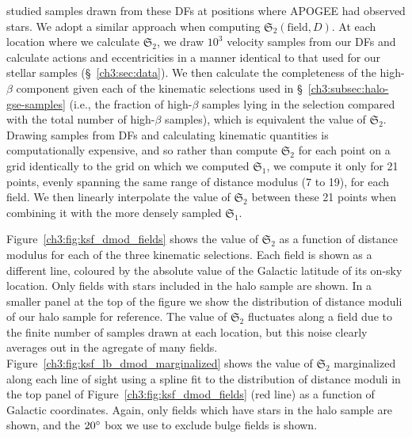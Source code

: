\cite{lane22} studied samples drawn from these DFs at positions where APOGEE had observed stars. We adopt a similar approach when computing $\mathfrak{S}_{2}(\mathrm{field},D)$. At each location where we calculate $\mathfrak{S}_{2}$, we draw $10^{3}$ velocity samples from our DFs and calculate actions and eccentricities in a manner identical to that used for our stellar samples (\S~\ref{ch3:sec:data}). We then calculate the completeness of the high-$\beta$ component given each of the kinematic selections used in \S~\ref{ch3:subsec:halo-gse-samples} (i.e., the fraction of high-$\beta$ samples lying in the selection compared with the total number of high-$\beta$ samples), which is equivalent the value of $\mathfrak{S}_{2}$. Drawing samples from DFs and calculating kinematic quantities is computationally expensive, and so rather than compute $\mathfrak{S}_{2}$ for each point on a grid identically to the grid on which we computed $\mathfrak{S}_{1}$, we compute it only for 21 points, evenly spanning the same range of distance modulus (7 to 19), for each field. We then linearly interpolate the value of $\mathfrak{S}_{2}$ between these 21 points when combining it with the more densely sampled $\mathfrak{S}_{1}$. 

Figure~\ref{ch3:fig:ksf_dmod_fields} shows the value of $\mathfrak{S}_{2}$ as a function of distance modulus for each of the three kinematic selections. Each field is shown as a different line, coloured by the absolute value of the Galactic latitude of its on-sky location. Only fields with stars included in the halo sample are shown. In a smaller panel at the top of the figure we show the distribution of distance moduli of our halo sample for reference. The value of $\mathfrak{S}_{2}$ fluctuates along a field due to the finite number of samples drawn at each location, but this noise clearly averages out in the agregate of many fields. Figure~\ref{ch3:fig:ksf_lb_dmod_marginalized} shows the value of $\mathfrak{S}_{2}$ marginalized along each line of sight using a spline fit to the distribution of distance moduli in the top panel of Figure~\ref{ch3:fig:ksf_dmod_fields} (red line) as a function of Galactic coordinates. Again, only fields which have stars in the halo sample are shown, and the $20\hbox{$^\circ$}$ box we use to exclude bulge fields is shown. 


